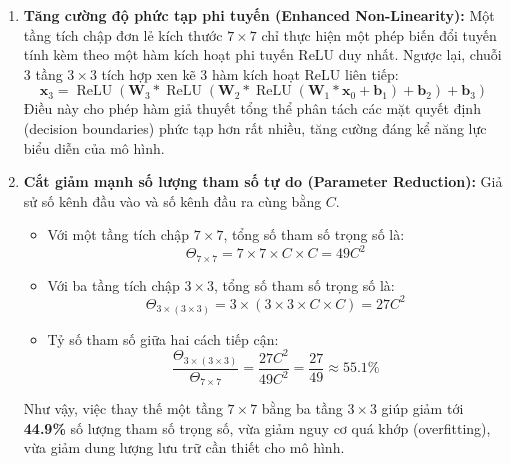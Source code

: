 \documentclass[12pt,a4paper]{report}
\begin{document}
\begin{enumerate}[leftmargin=*]
    \item \textbf{Tăng cường độ phức tạp phi tuyến (Enhanced Non-Linearity):}
    Một tầng tích chập đơn lẻ kích thước $7 \times 7$ chỉ thực hiện một phép biến đổi tuyến tính kèm theo một hàm kích hoạt phi tuyến ReLU duy nhất. Ngược lại, chuỗi 3 tầng $3 \times 3$ tích hợp xen kẽ 3 hàm kích hoạt ReLU liên tiếp:
    \begin{equation}
        \mathbf{x}_3 = \operatorname{ReLU}\left(\mathbf{W}_3 * \operatorname{ReLU}\left(\mathbf{W}_2 * \operatorname{ReLU}\left(\mathbf{W}_1 * \mathbf{x}_0 + \mathbf{b}_1\right) + \mathbf{b}_2\right) + \mathbf{b}_3\right)
    \end{equation}
    Điều này cho phép hàm giả thuyết tổng thể phân tách các mặt quyết định (decision boundaries) phức tạp hơn rất nhiều, tăng cường đáng kể năng lực biểu diễn của mô hình.

    \item \textbf{Cắt giảm mạnh số lượng tham số tự do (Parameter Reduction):}
    Giả sử số kênh đầu vào và số kênh đầu ra cùng bằng $C$.
    \begin{itemize}
        \item Với một tầng tích chập $7 \times 7$, tổng số tham số trọng số là:
        \begin{equation}
            \Theta_{7 \times 7} = 7 \times 7 \times C \times C = 49 C^2
        \end{equation}
        \item Với ba tầng tích chập $3 \times 3$, tổng số tham số trọng số là:
        \begin{equation}
            \Theta_{3 \times (3 \times 3)} = 3 \times (3 \times 3 \times C \times C) = 27 C^2
        \end{equation}
        \item Tỷ số tham số giữa hai cách tiếp cận:
        \begin{equation}
            \frac{\Theta_{3 \times (3 \times 3)}}{\Theta_{7 \times 7}} = \frac{27 C^2}{49 C^2} = \frac{27}{49} \approx 55.1\%
        \end{equation}
    \end{itemize}
    Như vậy, việc thay thế một tầng $7 \times 7$ bằng ba tầng $3 \times 3$ giúp giảm tới \textbf{44.9\%} số lượng tham số trọng số, vừa giảm nguy cơ quá khớp (overfitting), vừa giảm dung lượng lưu trữ cần thiết cho mô hình.
\end{enumerate}
\end{document}
